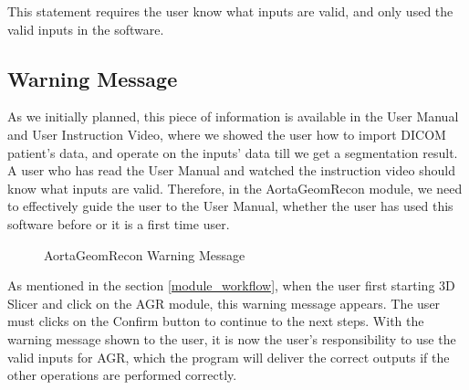 This statement requires the user know what inputs are valid, and only used the valid inputs in the software.

\subsection{Warning Message}

As we initially planned, this piece of information is available in the User Manual and User Instruction Video, where we showed the user how to import DICOM patient's data, and operate on the inputs' data till we get a segmentation result. A user who has read the User Manual and watched the instruction video should know what inputs are valid. Therefore, in the AortaGeomRecon module, we need to effectively guide the user to the User Manual, whether the user has used this software before or it is a first time user.

\begin{figure}[H]
    \centering
    \caption[AortaGeomRecon Warning Message]{AortaGeomRecon Warning Message}
    \label{fig_agr_ac_wm}
\end{figure}

As mentioned in the section \ref{module_workflow}, when the user first starting 3D Slicer and click on the AGR module, this warning message appears. The user must clicks on the Confirm button to continue to the next steps. With the warning message shown to the user, it is now the user's responsibility to use the valid inputs for AGR, which the program will deliver the correct outputs if the other operations are performed correctly. 



